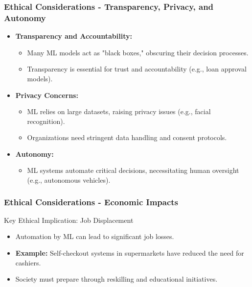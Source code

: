 \documentclass[aspectratio=169]{beamer}
\begin{document}
\begin{frame}[fragile]
    \frametitle{Ethical Considerations - Transparency, Privacy, and Autonomy}
    \begin{itemize}
        \item \textbf{Transparency and Accountability:}
        \begin{itemize}
            \item Many ML models act as "black boxes," obscuring their decision processes.
            \item Transparency is essential for trust and accountability (e.g., loan approval models).
        \end{itemize}
        
        \item \textbf{Privacy Concerns:}
        \begin{itemize}
            \item ML relies on large datasets, raising privacy issues (e.g., facial recognition).
            \item Organizations need stringent data handling and consent protocols.
        \end{itemize}
        
        \item \textbf{Autonomy:}
        \begin{itemize}
            \item ML systems automate critical decisions, necessitating human oversight (e.g., autonomous vehicles).
        \end{itemize}
    \end{itemize}
\end{frame}

\begin{frame}[fragile]
    \frametitle{Ethical Considerations - Economic Impacts}
    \begin{block}{Key Ethical Implication: Job Displacement}
        \begin{itemize}
            \item Automation by ML can lead to significant job losses.
            \item \textbf{Example:} 
            Self-checkout systems in supermarkets have reduced the need for cashiers.
        \end{itemize}
    \end{block}
    \begin{itemize}
        \item Society must prepare through reskilling and educational initiatives.
    \end{itemize}
\end{frame}
\end{document}
